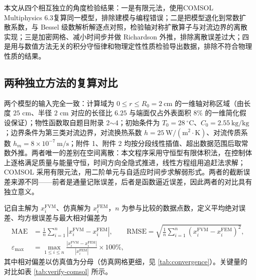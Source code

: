 \documentclass[12pt,a4paper]{article}
\begin{document}
\begin{center}
本文从四个相互独立的角度检验结果：一是有限元法，使用COMSOL Multiphysics 6.3复算同一模型，排除建模与编程错误；二是把模型退化到常数扩散系数，与 Bessel 级数解析解逐点对照，检验轴对称扩散算子与对流边界的离散实现；三是加密网格、减小时间步并做 Richardson 外推，排除离散误差过大；四是用与数值方法无关的积分守恒律和物理定性性质检验导出数据，排除不符合物理性质的结果。

\subsection{两种独立方法的复算对比}

两个模型的输入完全一致：计算域为 $0\le r\le R_0=2\ \mathrm{cm}$ 的一维轴对称区域（由长度 $25$ cm、半径 $2$ cm 对应的长径比 $6.25$ 与端面仅占外表面积 $8\%$ 的一维简化假设保证）；物性函数取自题目附录 2$\sim$4；初始条件为 $T_0=28\ \mathrm{^\circ C}$、$C_0=2.55\ \mathrm{kg/kg}$；边界条件为第三类对流边界，对流换热系数 $h=25\ \mathrm{W/(m^2\cdot K)}$、对流传质系数 $h_m=8\times10^{-7}\ \mathrm{m/s}$；附件 1、附件 2 均按分段线性插值、超出数据范围后取常数外推。两者唯一的差别在空间离散：本文程序采用守恒型有限体积法，在控制体上逐格满足质量与能量守恒，时间方向全隐式推进，线性方程组用追赶法求解；COMSOL 采用有限元法，用二阶单元与自适应时间步求解弱形式。两者的截断误差来源不同——前者是通量记账误差，后者是函数逼近误差，因此两者的对比具有独立意义。

记自主解为 $x_i^{\mathrm{FVM}}$、仿真解为 $x_i^{\mathrm{FEM}}$，$n$ 为参与比较的数据点数，定义平均绝对误差、均方根误差与最大相对偏差为
\begin{equation}
\begin{aligned}
\mathrm{MAE}&=\frac{1}{n}\sum_{i=1}^{n}\left|x_i^{\mathrm{FVM}}-x_i^{\mathrm{FEM}}\right|,\qquad
\mathrm{RMSE}=\sqrt{\frac{1}{n}\sum_{i=1}^{n}\left(x_i^{\mathrm{FVM}}-x_i^{\mathrm{FEM}}\right)^2},\\
\varepsilon_{\max}&=\max_{1\le i\le n}\frac{\left|x_i^{\mathrm{FVM}}-x_i^{\mathrm{FEM}}\right|}{\left|x_i^{\mathrm{FEM}}\right|}\times100\%,
\end{aligned}
\end{equation}
其中相对偏差以仿真值为分母（仿真网格更细，见 \ref{tab:convergence}）。关键量的对比如表 \ref{tab:verify-comsol} 所示。


\end{center}
\end{document}
